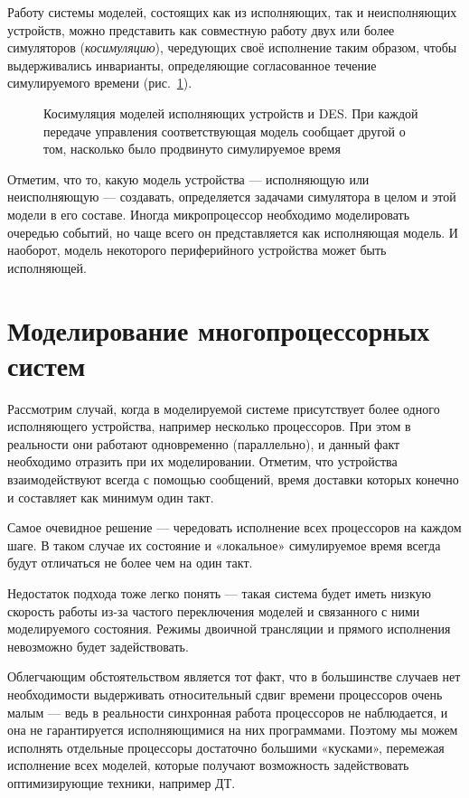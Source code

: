 Работу системы моделей, состоящих как из исполняющих, так и неисполняющих устройств, можно представить как совместную работу двух или более симуляторов (\textit{косимуляцию}), чередующих своё исполнение таким образом, чтобы выдерживались инварианты, определяющие согласованное течение симулируемого времени (рис. \ref{fig:cosim}).

\begin{figure}[htb]
    \centering
    \caption[Косимуляция моделей исполняющих устройств и DES]{Косимуляция моделей исполняющих устройств и DES. При каждой передаче управления соответствующая модель сообщает другой о том, насколько было продвинуто симулируемое время}
    \label{fig:cosim}
\end{figure}

Отметим, что то, какую модель устройства — исполняющую или неисполняющую — создавать, определяется задачами симулятора в целом и этой модели в его составе. Иногда микропроцессор необходимо моделировать очередью событий, но чаще всего он представляется как исполняющая модель. И наоборот, модель некоторого периферийного устройства может быть исполняющей.

\section{Моделирование многопроцессорных систем}\label{sec:mp-simulation}

Рассмотрим случай, когда в моделируемой системе присутствует более одного исполняющего устройства, например несколько процессоров. При этом в реальности они работают одновременно (параллельно), и данный факт необходимо отразить при их моделировании. Отметим, что устройства взаимодействуют всегда с помощью сообщений, время доставки которых конечно и составляет как минимум один такт.

Самое очевидное решение — чередовать исполнение всех процессоров на каждом  шаге. В таком случае их состояние и «локальное» симулируемое время всегда будут отличаться не более чем на один такт.

Недостаток подхода тоже легко понять — такая система будет иметь низкую скорость работы из-за частого переключения моделей и связанного с ними моделируемого состояния. Режимы двоичной трансляции и прямого исполнения невозможно будет задействовать.

Облегчающим обстоятельством является тот факт, что в большинстве случаев нет необходимости выдерживать относительный сдвиг времени процессоров очень малым — ведь в реальности синхронная работа процессоров не наблюдается, и она не гарантируется исполняющимися на них программами. Поэтому мы можем исполнять отдельные процессоры достаточно большими «кусками», перемежая исполнение всех моделей, которые получают возможность задействовать оптимизирующие техники, например ДТ.

